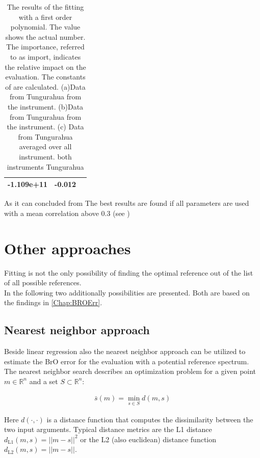\documentclass  [
  paper    = a4,
  BCOR     = 10mm,
  twoside,
  fontsize = 12pt,
  fleqn,
  toc      = bibnumbered,
  toc      = listofnumbered,
  numbers  = noendperiod,
  headings = normal,
  listof   = leveldown,
  version  = 3.03
]                                       {scrreprt}
\begin{document}
\begin{table}[h!]
{\begin{tabular}{c|c|c}
			\midrule
			-1.109e+11&-0.012\\
			\midrule
			\bottomrule
	\end{tabular}}
		\caption{The results of the fitting with a first order polynomial. The value shows the actual number. The importance,  referred to as
			import,  indicates the relative impact on the evaluation.
			The constants of  are calculated.
			(a)Data from Tungurahua  from the instrument. 
			(b)Data from Tungurahua from the  instrument. %
			(c) Data from Tungurahua averaged over all instrument.  %
			 both instruments Tungurahua%
		 }
		\label{tab:coefTung}
	\end{table}			
	As it can concluded from  The best results are found if all parameters are used with a mean correlation above 0.3 (see )
	\section{Other approaches}

	Fitting is not the only possibility of finding the optimal reference out of the list of all possible references.\\
	In the following two additionally possibilities are presented. Both are based on the findings in \cref{Chap:BROErr}. 

\subsection{Nearest neighbor approach}


Beside linear regression also the nearest neighbor approach can be utilized to estimate the BrO error for the evaluation with a potential reference spectrum.
%
The nearest neighbor search describes an optimization problem for a given point $m \in \mathbb{R}^n$ and a set $S \subset \mathbb{R}^n$:

%

\begin{align}
\bar{s}(m) = \min_{s \in S} d(m, s) \label{eq:1nn}
\end{align}

%
Here $d(\cdot, \cdot)$ is a distance function that computes the dissimilarity between the two input arguments. Typical distance metrics are the L1 distance $d_{\text{L1} 	
}(m, s) = ||m - s||^2$ or the L2 (also euclidean) distance function $d_{\text{L2} 
}(m, s) = ||m - s||$. 
\end{document}
